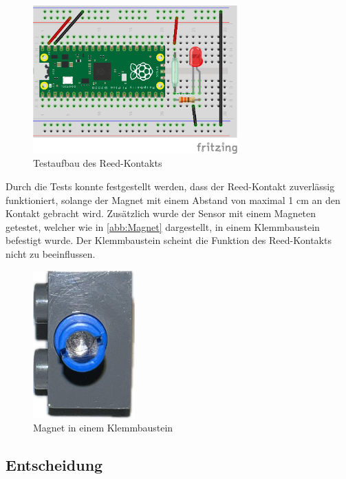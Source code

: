 \begin{figure}[H]
    \centering
    \includegraphics[width=0.7\textwidth]{Assets/Images/4-Entwicklung-der-GFA/Reed-Test1_bb.png}
    \caption{Testaufbau des Reed-Kontakts}\label{abb:Reed-Kontakt}
\end{figure}

Durch die Tests konnte festgestellt werden, dass der Reed-Kontakt zuverlässig funktioniert, solange der Magnet mit einem Abstand von maximal 1 cm an den Kontakt gebracht wird. Zusätzlich wurde der Sensor mit einem Magneten getestet, welcher wie in \autoref{abb:Magnet} dargestellt, in einem Klemmbaustein befestigt wurde. Der Klemmbaustein scheint die Funktion des Reed-Kontakts nicht zu beeinflussen.

\begin{figure}[H]
    \centering
    \includegraphics[width=0.35\textwidth]{Assets/Images/4-Entwicklung-der-GFA/Magnet.png}
    \caption{Magnet in einem Klemmbaustein}\label{abb:Magnet}
\end{figure}

\subsection{Entscheidung}\label{text:Entwicklung-der-GFA:Achszähler:Entscheidung}

